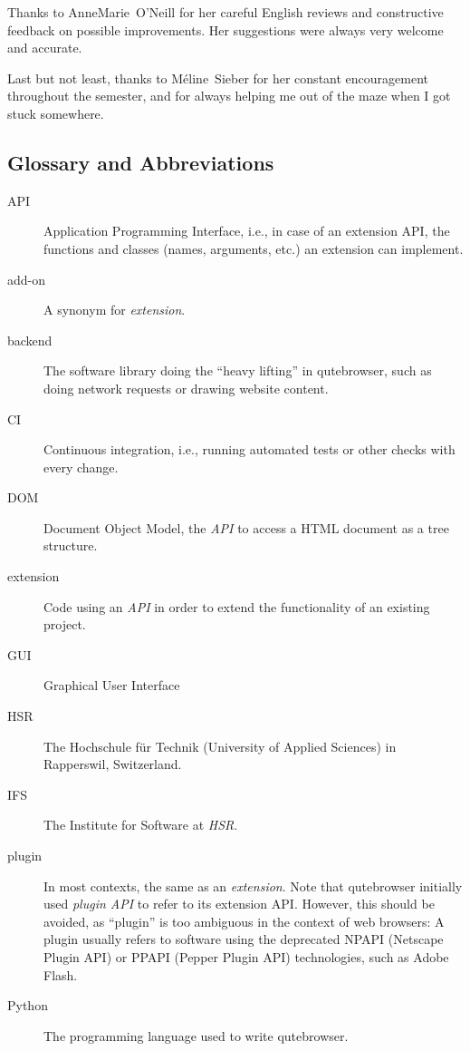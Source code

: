 \documentclass[a4paper,parskip=full]{scrreprt}
\begin{document}
Thanks to AnneMarie~O'Neill for her careful English reviews and constructive
feedback on possible improvements. Her suggestions were always very welcome and
accurate.

Last but not least, thanks to Méline~Sieber for her constant encouragement
throughout the semester, and for always helping me out of the maze when I got
stuck somewhere.



\begin{appendices}
\chapter{Glossary and Abbreviations}
\begin{description}
  \item[API]{Application Programming Interface, i.e., in
      case of an extension API, the functions and classes (names, arguments,
      etc.) an extension can implement.}
  \item[add-on]{A synonym for \emph{extension}.}
  \item[backend]{The software library doing the ``heavy lifting'' in
      qutebrowser, such as doing network requests or drawing website content.}
  \item[CI]{Continuous integration, i.e., running automated tests or other
      checks with every change.}
  \item[DOM]{Document Object Model, the \emph{API} to access a HTML document as
      a tree structure.}
  \item[extension]{Code using an \emph{API} in order to extend the functionality
      of an existing project.}
  \item[GUI]{Graphical User Interface}
  \item[HSR]{The Hochschule für Technik (University of Applied Sciences) in
      Rapperswil, Switzerland.}
  \item[IFS]{The Institute for Software at \emph{HSR}.}
  \item[plugin]{In most contexts, the same as an \emph{extension}. Note that
      qutebrowser initially used \emph{plugin API} to refer to its extension
      API. However, this should be avoided, as ``plugin'' is too ambiguous in
      the context of web browsers: A plugin usually refers to software using the
      deprecated NPAPI (Netscape Plugin API) or PPAPI (Pepper Plugin API)
      technologies, such as Adobe Flash.}
  \item[Python]{The programming language used to write qutebrowser.}

\end{description}
\end{appendices}
\end{document}
